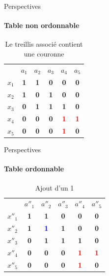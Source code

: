 \documentclass{beamer}
\begin{document}
  \begin{frame}{Perspectives}
  \framesubtitle{Table non ordonnable}
\begin{table}[htb]
  \centering

\begin{tabular}{lccccc}
 & $a_1$ & $a_2$ & $a_3$ & $a_4$ & $a_5$\\
$x_1$ & \textbf{1} & \textbf{1} & \textbf{0} & \textbf{0} & \textbf{0}\\
$x_2$ & \textbf{1} & \textbf{0} & \textbf{1} & \textbf{0} & \textbf{0}\\
$x_3$ & \textbf{0} & \textbf{1} & \textbf{1} & \textbf{1} & \textbf{0}\\
$x_4$ & \textbf{0} & \textbf{0} & \textbf{0} & \textcolor{red}{\textbf{1}} & \textcolor{red}{\textbf{1}}\\
$x_5$ & \textbf{0} & \textbf{0} & \textbf{0} & \textcolor{red}{\textbf{1}} & \textbf{0}

\end{tabular}
\caption{Le treillis associé contient une couronne}
\end{table}
  \end{frame} 


 \begin{frame}{Perspectives}
  \framesubtitle{Table ordonnable}
	\begin{table}[htb]
	  \centering

	\begin{tabular}{lccccc}
	& $a''_1$ & $a''_2$ & $a''_3$ & $a''_4$ & $a''_5$\\
	$x''_1$ & \textbf{1} & \textbf{1} & \textbf{0} & \textbf{0} & \textbf{0}\\
	$x''_2$ & \textbf{1} & \textcolor{blue}{\textbf{1}} & \textbf{1} & \textbf{0} & \textbf{0}\\
	$x''_3$ & \textbf{0} & \textbf{1} & \textbf{1} & \textbf{1} & \textbf{0}\\
	$x''_4$ & \textbf{0} & \textbf{0} & \textbf{0} & \textcolor{red}{\textbf{1}} & \textcolor{red}{\textbf{1}}\\
	$x''_5$ & \textbf{0} & \textbf{0} & \textbf{0} & \textcolor{red}{\textbf{1}} & \textbf{0}
	\end{tabular}
  \caption{Ajout d'un 1}
	\end{table}
  \end{frame}
\end{document}
